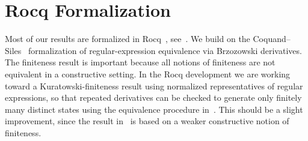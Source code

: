 \section*{Rocq Formalization}

Most of our results are formalized in Rocq~\cite{Rocq}, see~\cite{OurRocqRepo}.
We build on the Coquand--Siles~\cite{CoquandRegexEquality,RocqRegexpBrzozowski}
formalization of regular-expression equivalence via Brzozowski derivatives.
The finiteness result is important because all notions of finiteness are not
equivalent in a constructive setting. In the Rocq development we are working
toward a Kuratowski-finiteness result using normalized representatives of
regular expressions, so that repeated derivatives can be checked to generate
only finitely many distinct states using the equivalence procedure
in~\cite{CoquandRegexEquality}. This should be a slight improvement, since the
result in~\cite{CoquandRegexEquality} is based on a weaker constructive notion
of finiteness.